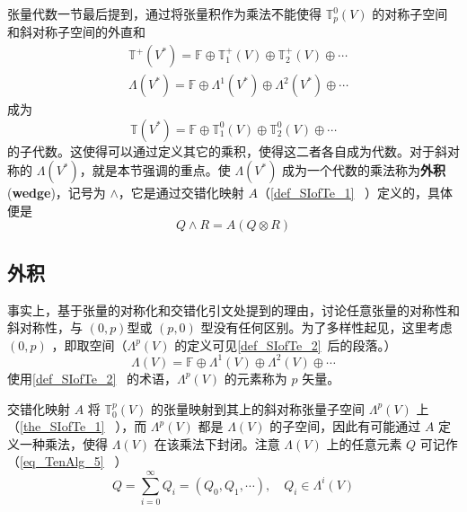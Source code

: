 



张量代数一节最后提到，通过将张量积作为乘法不能使得 $\mathbb T_p^0(V)$ 的对称子空间和斜对称子空间的外直和 
\begin{equation}
\begin{aligned}
&\mathbb T^+(V^*)=\mathbb F\oplus\mathbb T_1^+(V)\oplus\mathbb T_2^+(V)\oplus\cdots\\
&\Lambda(V^*)=\mathbb F\oplus \Lambda^1(V^*)\oplus\Lambda^2(V^*)\oplus\cdots
\end{aligned}
\end{equation}
成为 
\begin{equation}
\mathbb T(V^*)=\mathbb F\oplus\mathbb T_1^0(V)\oplus\mathbb T_2^0(V)\oplus\cdots
\end{equation}
的子代数。这使得可以通过定义其它的乘积，使得这二者各自成为代数。对于斜对称的 $\Lambda(V^*)$，就是本节强调的重点。使 $\Lambda(V^*)$ 成为一个代数的乘法称为\textbf{外积}(\textbf{wedge})，记号为 $\wedge$，它是通过交错化映射 $A$（\autoref{def_SIofTe_1}~ ）定义的，具体便是
\begin{equation}
Q\wedge R=A(Q\otimes R)
\end{equation}

\subsection{外积}
事实上，基于张量的对称化和交错化引文处提到的理由，讨论任意张量的对称性和斜对称性，与 $(0,p)$型或 $(p,0)$ 型没有任何区别。为了多样性起见，这里考虑 $(0,p)$ ，即取空间（$\Lambda^p(V)$ 的定义可见\autoref{def_SIofTe_2}~后的段落。） 
\begin{equation}\label{eq_WegofT_9}
\Lambda(V)=\mathbb F\oplus \Lambda^1(V)\oplus\Lambda^2(V)\oplus\cdots
\end{equation}
使用\autoref{def_SIofTe_2}~ 的术语，$\Lambda^p(V)$ 的元素称为 $p$ 矢量。

交错化映射 $A$ 将 $\mathbb T_0^p(V)$ 的张量映射到其上的斜对称张量子空间 $\Lambda^p(V)$ 上（\autoref{the_SIofTe_1}~ ），而 $\Lambda^p(V)$ 都是 $\Lambda(V)$ 的子空间，因此有可能通过 $A$ 定义一种乘法，使得 $\Lambda(V)$ 在该乘法下封闭。注意 $ \Lambda(V)$ 上的任意元素 $Q$ 可记作（\autoref{eq_TenAlg_5}~ ）
\begin{equation}\label{eq_WegofT_2}
Q=\sum_{i=0}^\infty Q_i=(Q_0,Q_1,\cdots),\quad Q_i\in\Lambda^i(V)
\end{equation}


